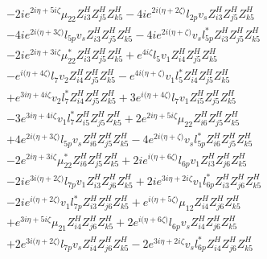  \begin{align} 
 & -2 i e^{2 i \eta +5 i \zeta } \mu_{22} Z_{{i 3}}^{H} Z_{{j 5}}^{H} Z_{{k 5}}^{H} -4 i e^{2 i \Big(\eta +2 \zeta \Big)} l_{2p} v_s Z_{{i 3}}^{H} Z_{{j 5}}^{H} Z_{{k 5}}^{H} \nonumber \\ 
 &-4 i e^{2 i \Big(\eta +3 \zeta \Big)} l_{5p} v_s Z_{{i 3}}^{H} Z_{{j 5}}^{H} Z_{{k 5}}^{H} -4 i e^{2 i \Big(\eta +\zeta \Big)} v_s l_{5p}^* Z_{{i 3}}^{H} Z_{{j 5}}^{H} Z_{{k 5}}^{H} \nonumber \\ 
 &-2 i e^{2 i \eta +3 i \zeta } \mu_{22}^* Z_{{i 3}}^{H} Z_{{j 5}}^{H} Z_{{k 5}}^{H} +e^{4 i \zeta } l_5 v_1 Z_{{i 4}}^{H} Z_{{j 5}}^{H} Z_{{k 5}}^{H} \nonumber \\ 
 &- e^{i \Big(\eta +4 \zeta \Big)} l_7 v_2 Z_{{i 4}}^{H} Z_{{j 5}}^{H} Z_{{k 5}}^{H} - e^{4 i \Big(\eta +\zeta \Big)} v_1 l_5^* Z_{{i 4}}^{H} Z_{{j 5}}^{H} Z_{{k 5}}^{H} \nonumber \\ 
 &+e^{3 i \eta +4 i \zeta } v_2 l_7^* Z_{{i 4}}^{H} Z_{{j 5}}^{H} Z_{{k 5}}^{H} +3 e^{i \Big(\eta +4 \zeta \Big)} l_7 v_1 Z_{{i 5}}^{H} Z_{{j 5}}^{H} Z_{{k 5}}^{H} \nonumber \\ 
 &-3 e^{3 i \eta +4 i \zeta } v_1 l_7^* Z_{{i 5}}^{H} Z_{{j 5}}^{H} Z_{{k 5}}^{H} +2 e^{2 i \eta +5 i \zeta } \mu_{22} Z_{{i 6}}^{H} Z_{{j 5}}^{H} Z_{{k 5}}^{H} \nonumber \\ 
 &+4 e^{2 i \Big(\eta +3 \zeta \Big)} l_{5p} v_s Z_{{i 6}}^{H} Z_{{j 5}}^{H} Z_{{k 5}}^{H} -4 e^{2 i \Big(\eta +\zeta \Big)} v_s l_{5p}^* Z_{{i 6}}^{H} Z_{{j 5}}^{H} Z_{{k 5}}^{H} \nonumber \\ 
 &-2 e^{2 i \eta +3 i \zeta } \mu_{22}^* Z_{{i 6}}^{H} Z_{{j 5}}^{H} Z_{{k 5}}^{H} +2 i e^{i \Big(\eta +6 \zeta \Big)} l_{6p} v_1 Z_{{i 3}}^{H} Z_{{j 6}}^{H} Z_{{k 5}}^{H} \nonumber \\ 
 &-2 i e^{3 i \Big(\eta +2 \zeta \Big)} l_{7p} v_1 Z_{{i 3}}^{H} Z_{{j 6}}^{H} Z_{{k 5}}^{H} +2 i e^{3 i \eta +2 i \zeta } v_1 l_{6p}^* Z_{{i 3}}^{H} Z_{{j 6}}^{H} Z_{{k 5}}^{H} \nonumber \\ 
 &-2 i e^{i \Big(\eta +2 \zeta \Big)} v_1 l_{7p}^* Z_{{i 3}}^{H} Z_{{j 6}}^{H} Z_{{k 5}}^{H} +e^{i \Big(\eta +5 \zeta \Big)} \mu_{12} Z_{{i 4}}^{H} Z_{{j 6}}^{H} Z_{{k 5}}^{H} \nonumber \\ 
 &+e^{3 i \eta +5 i \zeta } \mu_{21} Z_{{i 4}}^{H} Z_{{j 6}}^{H} Z_{{k 5}}^{H} +2 e^{i \Big(\eta +6 \zeta \Big)} l_{6p} v_s Z_{{i 4}}^{H} Z_{{j 6}}^{H} Z_{{k 5}}^{H} \nonumber \\ 
 &+2 e^{3 i \Big(\eta +2 \zeta \Big)} l_{7p} v_s Z_{{i 4}}^{H} Z_{{j 6}}^{H} Z_{{k 5}}^{H} -2 e^{3 i \eta +2 i \zeta } v_s l_{6p}^* Z_{{i 4}}^{H} Z_{{j 6}}^{H} Z_{{k 5}}^{H} \nonumber \\ 

\end{align}
